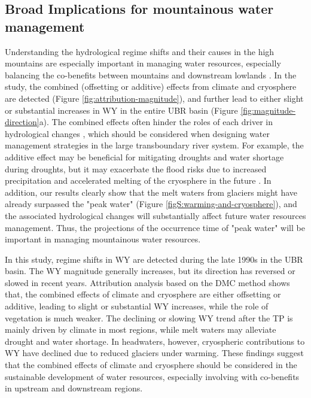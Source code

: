 \documentclass[hess, manuscript]{copernicus}
\begin{document}
\subsection{Broad Implications for mountainous water management}
Understanding the hydrological regime shifts and their causes in the high mountains are especially important in managing water resources, especially balancing the co-benefits between mountains and downstream lowlands \citep{viviroli2011climate}. 
In the study, the combined (offsetting or additive) effects from climate and cryosphere are detected (Figure \ref{fig:attribution-magnitude}), and further lead to either slight or substantial increases in WY in the entire UBR basin (Figure \ref{fig:magnitude-direction}a). 
The combined effects often hinder the roles of each driver in hydrological changes \citep{wei2018,zhang2021deforestation}, which should be considered when designing water management strategies in the large transboundary river system.
For example, the additive effect may be beneficial for mitigating droughts and water shortage during droughts, but it may exacerbate the flood risks due to increased precipitation and accelerated melting of the cryosphere in the future \citep{Immerzeel2013}.
In addition, our results clearly show that the melt waters from glaciers might have already surpassed the "peak water" (Figure \ref{figS:warming-and-cryosphere}), and the associated hydrological changes will substantially affect future water resources management. Thus, the projections of the occurrence time of "peak water" will be important in managing mountainous water resources.

\conclusions 
In this study, regime shifts in WY are detected during the late 1990s in the UBR basin. The WY magnitude generally increases, but its direction has reversed or slowed in recent years. 
Attribution analysis based on the DMC method shows that, the combined effects of climate and cryosphere are either offsetting or additive, leading to slight or substantial WY increases, while the role of vegetation is much weaker. 
The declining or slowing WY trend after the TP is mainly driven by climate in most regions, while melt waters may alleviate drought and water shortage. 
In headwaters, however, cryospheric contributions to WY have declined due to reduced glaciers under warming.
These findings suggest that the combined effects of climate and cryosphere should be considered in the sustainable development of water resources, especially involving with co-benefits in upstream and downstream regions.
\end{document}
